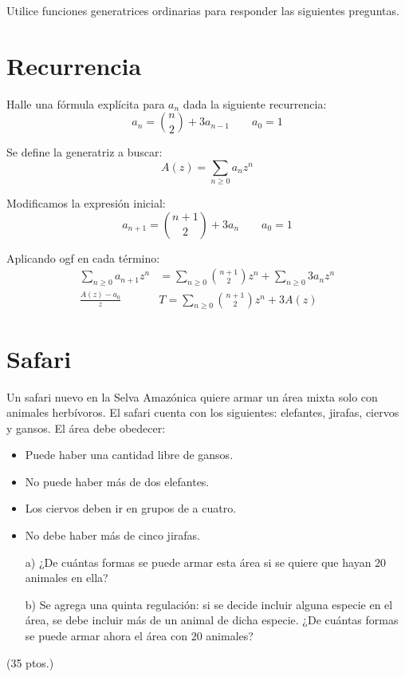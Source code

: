 \documentclass[spanish, fleqn]{article}
\title{Estructuras Discretas \\
	Tarea \#\num \\
	``Cómo aprender a generar en una tarde''}
\author{Andrés Navarro \\ (201673001-K)}
\date{}
\begin{document}
	\maketitle
	\thispagestyle{empty}
	
    Utilice funciones generatrices ordinarias para responder las siguientes preguntas.
    
	\section{Recurrencia}
	Halle una fórmula explícita para \(a_n\) dada la siguiente recurrencia:
    \begin{equation*}
    a_{n} = {n \choose 2} + 3a_{n-1} \qquad a_{0}=1
    \end{equation*}
    
    Se define la generatriz a buscar:
    \begin{equation*}
    A(z) = \sum_{n \geqslant 0} a_n z^n
    \end{equation*}
	
	Modificamos la expresión inicial:
	\begin{equation*}
	a_{n+1} = {n+1 \choose 2} + 3a_{n} \qquad a_{0}=1
	\end{equation*}
	
	Aplicando ogf en cada término:
	\begin{align*}
	\sum_{n \geqslant 0} a_{n+1}z^n &= \sum_{n \geqslant 0} {n+1 \choose 2}z^n +\sum_{n \geqslant 0} 3a_{n}z^n \\
	\frac{A(z)- a_{0}}{z} &T= \sum_{n \geqslant 0} {n+1 \choose 2}z^n + 3A(z)
	\end{align*}
	\section{Safari}
	Un safari nuevo en la Selva Amazónica quiere armar un área mixta solo con animales herbívoros. El safari cuenta con los siguientes: elefantes, jirafas, ciervos y gansos. El área debe obedecer:
    \begin{itemize}
    \item Puede haber una cantidad libre de gansos.
    \item No puede haber más de dos elefantes.
    \item Los ciervos deben ir en grupos de a cuatro.
    \item No debe haber más de cinco jirafas.
    \end{itemize}
    \begin{enumerate}
    \item[a)] ¿De cuántas formas se puede armar esta área si se quiere que hayan 20 animales en ella?
    \item[b)] Se agrega una quinta regulación: si se decide incluir alguna especie en el área, se debe incluir más de un animal de dicha especie. ¿De cuántas formas se puede armar ahora el área con 20 animales?
    \end{enumerate}
	\hfill (35 ptos.)
	
\end{document}
